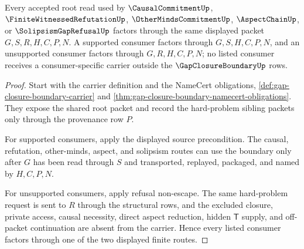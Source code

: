 \begin{theorem}
\label{thm:gap-closure-boundary-hard-problem-consumer-factorization}
Every accepted root read used by $\CausalCommitmentUp$, $\FiniteWitnessedRefutationUp$, $\OtherMindsCommitmentUp$, $\AspectChainUp$, or $\SolipsismGapRefusalUp$ factors through the same displayed packet $G,S,R,H,C,P,N$. A supported consumer factors through $G,S,H,C,P,N$, and an unsupported consumer factors through $G,R,H,C,P,N$; no listed consumer receives a consumer-specific carrier outside the $\GapClosureBoundaryUp$ rows.
\end{theorem}
\begin{proof}
Start with the carrier definition and the NameCert obligations, \autoref{def:gap-closure-boundary-carrier} and \autoref{thm:gap-closure-boundary-namecert-obligations}. They expose the shared root packet and record the hard-problem sibling packets only through the provenance row $P$.

For supported consumers, apply the displayed source precondition. The causal, refutation, other-minds, aspect, and solipsism routes can use the boundary only after $G$ has been read through $S$ and transported, replayed, packaged, and named by $H,C,P,N$.

For unsupported consumers, apply refusal non-escape. The same hard-problem request is sent to $R$ through the structural rows, and the excluded closure, private access, causal necessity, direct aspect reduction, hidden $\mathsf{T}$ supply, and off-packet continuation are absent from the carrier. Hence every listed consumer factors through one of the two displayed finite routes.
\end{proof}

